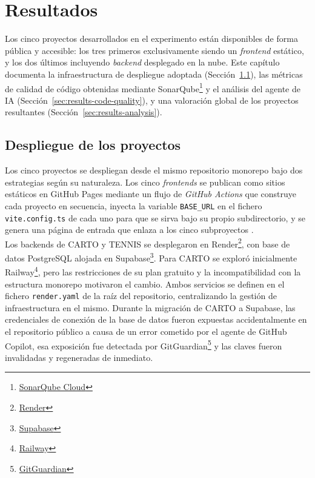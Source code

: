 
\chapter{Resultados} \label{chap:Results}

Los cinco proyectos desarrollados en el experimento están disponibles \cite{URL::TFG-Web} de forma pública y accesible: los tres primeros exclusivamente siendo un \textit{frontend} estático, y los dos últimos incluyendo \textit{backend} desplegado en la nube. Este capítulo documenta la infraestructura de despliegue adoptada (Sección~\ref{sec:results-deployment}), las métricas de calidad de código obtenidas mediante SonarQube\footnote{\href{https://sonarcloud.io}{SonarQube Cloud}} y el análisis del agente de \ac{IA} (Sección~\ref{sec:results-code-quality}), y una valoración global de los proyectos resultantes (Sección~\ref{sec:results-analysis}).

\section{Despliegue de los proyectos} \label{sec:results-deployment}

Los cinco proyectos se despliegan desde el mismo repositorio monorepo bajo dos estrategias según su naturaleza. Los cinco \textit{frontends} se publican como sitios estáticos en GitHub Pages mediante un flujo de \textit{GitHub Actions} que construye cada proyecto en secuencia, inyecta la variable \texttt{BASE\_URL} en el fichero \texttt{vite.config.ts} de cada uno para que se sirva bajo su propio subdirectorio, y se genera una página de entrada que enlaza a los cinco subproyectos \cite{URL::TFG-Web}.\\

Los backends de \ac{CARTO} y \ac{TENNIS} se desplegaron en Render\footnote{\href{https://render.com}{Render}}, con base de datos PostgreSQL alojada en Supabase\footnote{\href{https://supabase.com}{Supabase}}. Para \ac{CARTO} se exploró inicialmente Railway\footnote{\href{https://railway.app}{Railway}}, pero las restricciones de su plan gratuito y la incompatibilidad con la estructura monorepo motivaron el cambio. Ambos servicios se definen en el fichero \texttt{render.yaml} de la raíz del repositorio, centralizando la gestión de infraestructura en el mismo. 
Durante la migración de \ac{CARTO} a Supabase, las credenciales de conexión de la base de datos fueron expuestas accidentalmente en el repositorio público a causa de un error cometido por el agente de GitHub Copilot, esa exposición fue detectada por GitGuardian\footnote{\href{https://www.gitguardian.com}{GitGuardian}} y las claves fueron invalidadas y regeneradas de inmediato.

